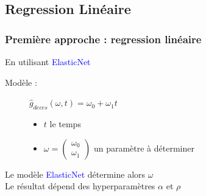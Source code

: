 \documentclass{beamer}[aspectratio = 43]
\begin{document}
\subsection*{Regression Linéaire}
\begin{frame}
	\frametitle{Première approche : regression linéaire}
	En utilisant \textcolor{blue}{ElasticNet} %
	
	\vspace{0.23 cm}
	Modèle :
	\begin{figure}[h]
		\begin{minipage}{0.35\textwidth}
			$\hat{g}_{deces} (\omega,t) =\omega_{0} +  \omega_{1} t$
		\end{minipage}%
		\begin{minipage}{0.65\textwidth}
			\begin{itemize}
				\item[] $t$ le temps
				\item[] 
				$\omega = 
				\begin{pmatrix}
					\omega_{0} \\
					\omega_{1}
				\end{pmatrix}$ un paramètre à déterminer
			\end{itemize}
		\end{minipage}
	\end{figure}
	\vspace{20pt}
	Le modèle \textcolor{blue}{ElasticNet} détermine alors $\omega$\\
	Le résultat dépend des hyperparamètres $\alpha$ et $\rho$
	

\end{frame}
\end{document}
